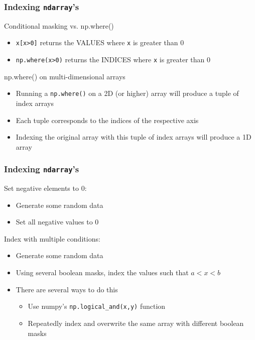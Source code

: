 \documentclass{beamer}
\newcommand{\code}[1]{\texttt{#1}}
\begin{document}
\begin{frame}	
	\frametitle{Indexing \code{ndarray}'s}
	
	\begin{block}{Conditional masking vs. np.where()}
		\begin{itemize}
			\item \code{x[x>0]} returns the VALUES where \code{x} is greater than 0
			\item \code{np.where(x>0)} returns the INDICES where \code{x} is greater than 0
		\end{itemize}
	\end{block}
	
	\begin{block}{np.where() on multi-dimensional arrays}
		\begin{itemize}
			\item Running a \code{np.where()} on a 2D (or higher) array will produce a tuple of index arrays
			\item Each tuple corresponds to the indices of the respective axis
			\item Indexing the original array with this tuple of index arrays will produce a 1D array
		\end{itemize}
	\end{block}
	
\end{frame}

\begin{frame}	
	\frametitle{Indexing \code{ndarray}'s}
	
	\begin{exampleblock}{Set negative elements to 0:}
		\begin{itemize}
			\footnotesize
			\item Generate some random data
			\item Set all negative values to 0
		\end{itemize}
	\end{exampleblock}
	
	\begin{exampleblock}{Index with multiple conditions:}
		\begin{itemize}
			\footnotesize
			\item Generate some random data
			\item Using several boolean masks, index the values such that $a<x<b$
			\item There are several ways to do this
			\begin{itemize}
				\footnotesize
				\item Use numpy's \code{np.logical\_and(x,y)} function
				\item Repeatedly index and overwrite the same array with different boolean masks
			\end{itemize}
		\end{itemize}
	\end{exampleblock}
	
\end{frame}
\end{document}
